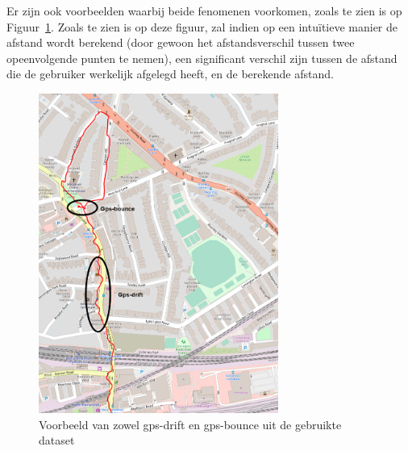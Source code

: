 Er zijn ook voorbeelden waarbij beide fenomenen voorkomen, zoals te zien is op
Figuur~\ref{fig:gps_drift_bounce_Strava}. Zoals te zien is op deze figuur, zal
indien op een intuïtieve manier de afstand wordt berekend (door gewoon het
afstandsverschil tussen twee opeenvolgende punten te nemen), een significant
verschil zijn tussen de afstand die de gebruiker werkelijk afgelegd heeft, en
de berekende afstand.
\begin{figure}
    \centering
    \includegraphics[width=0.7\textwidth]{fig/Afwijkingen&Analyses/Crooked Routes/1_notSnapped.png}
    \caption{Voorbeeld van zowel gps-drift en gps-bounce uit de gebruikte dataset}\label{fig:gps_drift_bounce_Strava}
\end{figure}

